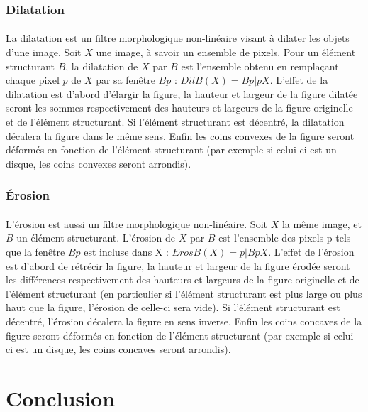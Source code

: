 \documentclass[12pt]{report}
\begin{document}
			\subsubsection{Dilatation}
			\paragraph{}
			
			La dilatation est un filtre morphologique non-linéaire visant à dilater les objets d'une image.
			Soit $X$ une image, à savoir un ensemble de pixels. Pour un élément structurant $B$, la dilatation
			de $X$ par $B$ est l'ensemble obtenu en remplaçant chaque pixel $p$ de $X$ par sa fenêtre $Bp$ :
			$DilB(X) =  {Bp | p  X}$.
			L'effet de la dilatation est d'abord d'élargir la figure, la hauteur et largeur de la figure dilatée seront les sommes respectivement des hauteurs et largeurs de la figure originelle et de l'élément structurant. Si l'élément structurant est décentré, la dilatation décalera la figure dans le même sens. Enfin les coins convexes de la figure seront déformés en fonction de l'élément structurant (par exemple si celui-ci est un disque, les coins convexes seront arrondis).
			
			\subsubsection{Érosion}
			\paragraph{}
			L'érosion est aussi un filtre morphologique non-linéaire.
			Soit $X$ la même image, et $B$ un élément structurant. L'érosion de $X$ par $B$ est l'ensemble des pixels p tels que la fenêtre $Bp$ est incluse dans X :
			$ErosB(X) = {p | Bp  X}$.
			L'effet de l'érosion est d'abord de rétrécir la figure, la hauteur et largeur de la figure érodée seront les différences respectivement des hauteurs et largeurs de la figure originelle et de l'élément structurant (en particulier si l'élément structurant est plus large ou plus haut que la figure, l'érosion de celle-ci sera vide). Si l'élément structurant est décentré, l'érosion décalera la figure en sens inverse. Enfin les coins concaves de la figure seront déformés en fonction de l'élément structurant (par exemple si celui-ci est un disque, les coins concaves seront arrondis).
			
	\section{Conclusion}
\end{document}
